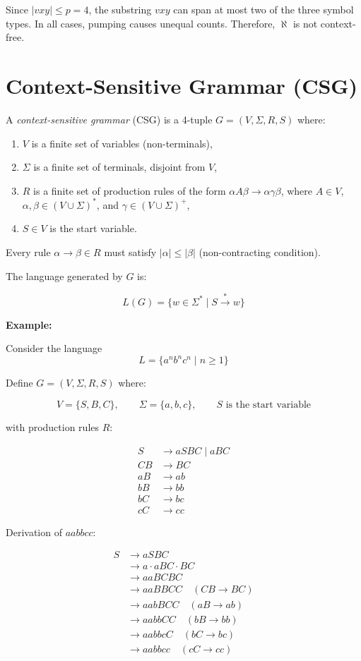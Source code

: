 \documentclass[12pt,a4paper,openany]{article}
\begin{document}
Since $|vxy| \leq p = 4$, the substring $vxy$ can span at most two of the three symbol types. In all cases, pumping causes unequal counts. Therefore, $\aleph$ is not context-free.

\section{Context-Sensitive Grammar (CSG)}

A \emph{context-sensitive grammar} (CSG) is a 4-tuple $G = (V, \Sigma, R, S)$ where:

\begin{enumerate}
    \item $V$ is a finite set of variables (non-terminals),
    \item $\Sigma$ is a finite set of terminals, disjoint from $V$,
    \item $R$ is a finite set of production rules of the form $\alpha A \beta \to \alpha \gamma \beta$,
    where $A \in V$, $\alpha, \beta \in (V \cup \Sigma)^*$, and $\gamma \in (V \cup \Sigma)^+$,
    \item $S \in V$ is the start variable.
\end{enumerate}

Every rule $\alpha \to \beta \in R$ must satisfy $|\alpha| \leq |\beta|$ (non-contracting condition).

The language generated by $G$ is:

\[
L(G) = \{ w \in \Sigma^* \mid S \overset{*}{\to} w \}
\]


\textbf{Example:} 

Consider the language \[L = \{a^n b^n c^n \mid n \geq 1\}\]

Define $G = (V, \Sigma, R, S)$ where:

\[
V = \{S, B, C\}, \qquad \Sigma = \{a, b, c\}, \qquad S \text{ is the start variable}
\]

with production rules $R$:

\begin{align*}
S &\to aSBC \mid aBC \\
CB &\to BC \\
aB &\to ab \\
bB &\to bb \\
bC &\to bc \\
cC &\to cc
\end{align*}

Derivation of $aabbcc$:

\begin{align*}
S &\to aSBC \\
  &\to a \cdot aBC \cdot BC \\
  &\to aaBCBC \\
  &\to aaBBCC \quad (CB \to BC) \\
  &\to aabBCC \quad (aB \to ab) \\
  &\to aabbCC \quad (bB \to bb) \\
  &\to aabbcC \quad (bC \to bc) \\
  &\to aabbcc \quad (cC \to cc)
\end{align*}
\end{document}
